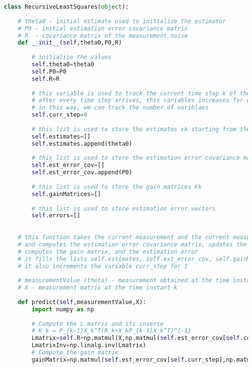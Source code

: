 \begin{lstlisting}[language=Python]
class RecursiveLeastSquares(object):
    
    # theta0 - initial estimate used to initialize the estimator
    # P0 - initial estimation error covariance matrix
    # R  - covariance matrix of the measurement noise
    def __init__(self,theta0,P0,R)
        
        # initialize the values
        self.theta0=theta0
        self.P0=P0
        self.R=R
        
        # this variable is used to track the current time step k of the estimator 
        # after every time step arrives, this variables increases for one 
        # in this way, we can track the number of variblaes
        self.curr_step=0
                  
        # this list is used to store the estimates xk starting from the initial estimate 
        self.estimates=[]
        self.estimates.append(theta0)
         
        # this list is used to store the estimation error covariance matrices Pk
        self.est_error_cov=[]
        self.est_error_cov.append(P0)
        
        # this list is used to store the gain matrices Kk
        self.gainMatrices=[]
         
        # this list is used to store estimation error vectors
        self.errors=[]
    
     
    # this function takes the current measurement and the current measurement matrix X
    # and computes the estimation error covariance matrix, updates the estimate, 
    # computes the gain matrix, and the estimation error
    # it fills the lists self.estimates, self.est_error_cov, self.gainMatrices, and self.errors
    # it also increments the variable curr_step for 1
    
    # measurementValue (theta) - measurement obtained at the time instant k
    # X - measurement matrix at the time instant k
    
    def predict(self,measurementValue,X):
        import numpy as np
        
        # Compute the L matrix and its inverse 
        # K_k = P_{k-1}X_k^T(R_k+X_kP_{k-1}X_k^T)^{-1}
        Lmatrix=self.R+np.matmul(X,np.matmul(self.est_error_cov[self.curr_step],X.T))
        LmatrixInv=np.linalg.inv(Lmatrix)
        # Compute the gain matrix
        gainMatrix=np.matmul(self.est_error_cov[self.curr_step],np.matmul(X.T,LmatrixInv))


\end{lstlisting}

